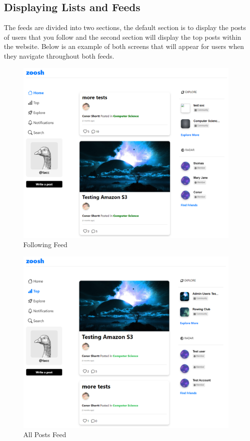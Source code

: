 \newpage
\subsection{Displaying Lists and Feeds}

The feeds are divided into two sections, the default section is to display the posts of users that you follow and the second section will display the top posts within the website. Below is an example of both screens that will appear for users when they navigate throughout both feeds.

\begin{figure}[H]
  \centering
  \includegraphics[scale=0.30]{img/screen2.PNG}
  \caption{Following Feed}
  \label{fig:Following Feed.}
\end{figure}

\begin{figure}[H]
  \centering
  \includegraphics[scale=0.30]{img/screen1.PNG}
  \caption{All Posts Feed}
  \label{fig:Top Posts Feed.}
\end{figure}

